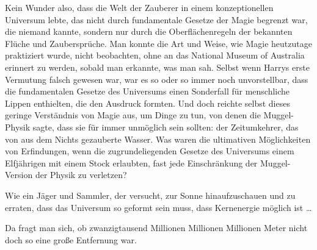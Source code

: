 Kein Wunder also, dass die Welt der Zauberer in einem konzeptionellen Universum lebte, das nicht durch fundamentale Gesetze der Magie begrenzt war, die niemand kannte, sondern nur durch die Oberflächenregeln der bekannten Flüche und Zaubersprüche. Man konnte die Art und Weise, wie Magie heutzutage praktiziert wurde, nicht beobachten, ohne an das National Museum of Australia erinnert zu werden, sobald man erkannte, was man sah. Selbst wenn Harrys erste Vermutung falsch gewesen war, war es so oder so immer noch unvorstellbar, dass die fundamentalen Gesetze des Universums einen Sonderfall für menschliche Lippen enthielten, die den Ausdruck  formten. Und doch reichte selbst dieses geringe Verständnis von Magie aus, um Dinge zu tun, von denen die Muggel-Physik sagte, dass sie für immer unmöglich sein sollten: der Zeitumkehrer, das von  aus dem Nichts gezauberte Wasser. Was waren die ultimativen Möglichkeiten von Erfindungen, wenn die zugrundeliegenden Gesetze des Universums einem Elfjährigen mit einem Stock erlaubten, fast jede Einschränkung der Muggel-Version der Physik zu verletzen?

Wie ein Jäger und Sammler, der versucht, zur Sonne hinaufzuschauen und zu erraten, dass das Universum so geformt sein muss, dass Kernenergie möglich ist …

Da fragt man sich, ob zwanzigtausend Millionen Millionen Millionen Meter nicht doch so eine große Entfernung war.

